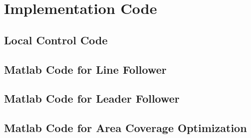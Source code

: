 \chapter{Implementation Code}
\label{ch:Appendix-Implementation-Code} 
\section{Local Control Code}

\section{Matlab Code for Line Follower}

\section{Matlab Code for Leader Follower}

\section{Matlab Code for Area Coverage Optimization}


